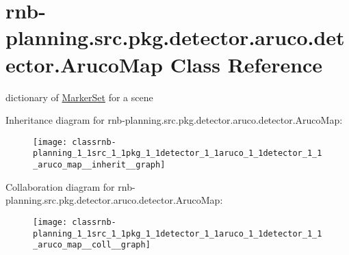 \hypertarget{classrnb-planning_1_1src_1_1pkg_1_1detector_1_1aruco_1_1detector_1_1_aruco_map}{}\section{rnb-\/planning.src.\+pkg.\+detector.\+aruco.\+detector.\+Aruco\+Map Class Reference}
\label{classrnb-planning_1_1src_1_1pkg_1_1detector_1_1aruco_1_1detector_1_1_aruco_map}


dictionary of \hyperlink{classrnb-planning_1_1src_1_1pkg_1_1detector_1_1aruco_1_1detector_1_1_marker_set}{Marker\+Set} for a scene  




Inheritance diagram for rnb-\/planning.src.\+pkg.\+detector.\+aruco.\+detector.\+Aruco\+Map\+:\nopagebreak
\begin{figure}[H]
\begin{center}
\leavevmode
\texttt{[image: classrnb-planning\_1\_1src\_1\_1pkg\_1\_1detector\_1\_1aruco\_1\_1detector\_1\_1\_aruco\_map\_\_inherit\_\_graph]}
\end{center}
\end{figure}


Collaboration diagram for rnb-\/planning.src.\+pkg.\+detector.\+aruco.\+detector.\+Aruco\+Map\+:\nopagebreak
\begin{figure}[H]
\begin{center}
\leavevmode
\texttt{[image: classrnb-planning\_1\_1src\_1\_1pkg\_1\_1detector\_1\_1aruco\_1\_1detector\_1\_1\_aruco\_map\_\_coll\_\_graph]}
\end{center}
\end{figure}

